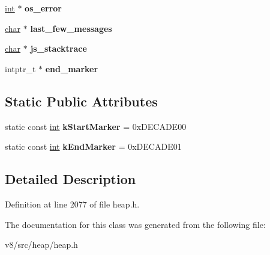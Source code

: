 \begin{DoxyCompactItemize}
\mbox{\label{classv8_1_1internal_1_1HeapStats_aa6205c52d7b9a5b80a103034c6dd134f}} 
\mbox{\hyperlink{classint}{int}} $\ast$ {\bfseries os\+\_\+error}
\item 
\mbox{\label{classv8_1_1internal_1_1HeapStats_aa213d3ff3ede753af944d06fa726c668}} 
\mbox{\hyperlink{classchar}{char}} $\ast$ {\bfseries last\+\_\+few\+\_\+messages}
\item 
\mbox{\label{classv8_1_1internal_1_1HeapStats_ae0cc8db0b9dd4d309c4aa89c083a656e}} 
\mbox{\hyperlink{classchar}{char}} $\ast$ {\bfseries js\+\_\+stacktrace}
\item 
\mbox{\label{classv8_1_1internal_1_1HeapStats_a3f515ce6734c2fd3a8021ac13b33d1d3}} 
intptr\+\_\+t $\ast$ {\bfseries end\+\_\+marker}
\end{DoxyCompactItemize}
\subsection*{Static Public Attributes}
\begin{DoxyCompactItemize}
\item 
\mbox{\label{classv8_1_1internal_1_1HeapStats_a205765088d14ac30ada403e983dc12da}} 
static const \mbox{\hyperlink{classint}{int}} {\bfseries k\+Start\+Marker} = 0x\+D\+E\+C\+A\+D\+E00
\item 
\mbox{\label{classv8_1_1internal_1_1HeapStats_a615e1138a3309a8a1a875f9aa93bf0ee}} 
static const \mbox{\hyperlink{classint}{int}} {\bfseries k\+End\+Marker} = 0x\+D\+E\+C\+A\+D\+E01
\end{DoxyCompactItemize}


\subsection{Detailed Description}


Definition at line 2077 of file heap.\+h.



The documentation for this class was generated from the following file\+:\begin{DoxyCompactItemize}
\item 
v8/src/heap/heap.\+h\end{DoxyCompactItemize}
